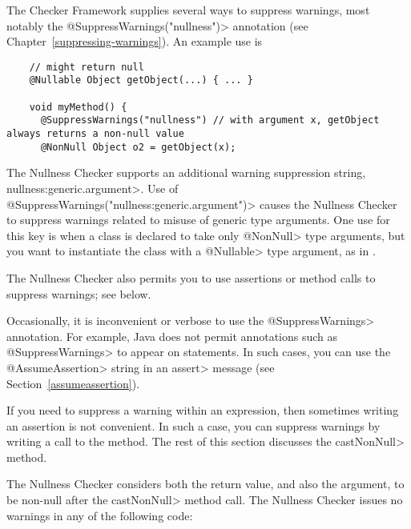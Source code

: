 \begin{sloppypar}
The Checker Framework supplies several ways to suppress warnings, most
notably the \<@SuppressWarnings("nullness")> annotation (see
Chapter~\ref{suppressing-warnings}).  An example use is
\end{sloppypar}

\begin{smaller}
\begin{Verbatim}
    // might return null
    @Nullable Object getObject(...) { ... }

    void myMethod() {
      @SuppressWarnings("nullness") // with argument x, getObject always returns a non-null value
      @NonNull Object o2 = getObject(x);
\end{Verbatim}
\end{smaller}


The Nullness Checker supports an additional warning suppression string,
\<nullness:generic.argument>.
Use of \<@SuppressWarnings("nullness:generic.argument")> causes the Nullness
Checker to suppress warnings related to misuse of generic type
arguments.  One use for this key is when a class is declared to take only
\<@NonNull> type arguments, but you want to instantiate the class with a
\<@Nullable> type argument, as in .

The Nullness Checker also permits you to use assertions or method calls to
suppress warnings; see below.




Occasionally, it is inconvenient or
verbose to use the \<@SuppressWarnings> annotation.  For example, Java does
not permit annotations such as \<@SuppressWarnings> to appear on statements.
In such cases, you can use the \<@AssumeAssertion> string in
an \<assert> message (see Section~\ref{assumeassertion}).

If you need to suppress a warning within an expression, then
sometimes writing an assertion is not convenient.  In such a case,
you can suppress warnings by writing a call to the
 method.
The rest of this section discusses the \<castNonNull> method.

The Nullness Checker considers both the return value, and also the
argument, to be non-null after the \<castNonNull> method call.
The Nullness Checker issues no warnings in any of the following
code:

